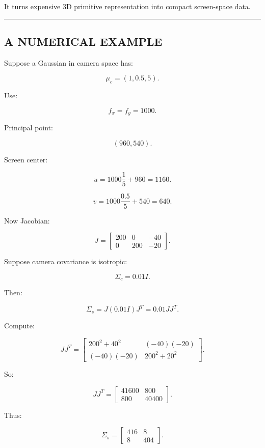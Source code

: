 It turns expensive 3D primitive representation into compact screen-space data.

\begin{center}\rule{0.5\linewidth}{0.5pt}\end{center}

\subsection{A NUMERICAL EXAMPLE}\label{04-visual-computing-ii-ch038-a-numerical-example}

\hypertarget{04-visual-computing-ii-ch038-a-numerical-example}{}

Suppose a Gaussian in camera space has:

\[
\mu_c=
(1,0.5,5).
\]

Use:

\[
f_x=f_y=1000.
\]

Principal point:

\[
(960,540).
\]

Screen center:

\[
u=
1000\frac15+960
=
1160.
\]

\[
v=
1000\frac{0.5}{5}+540
=
640.
\]

Now Jacobian:

\[
J=
\begin{bmatrix}
200&0&-40\\
0&200&-20
\end{bmatrix}.
\]

Suppose camera covariance is isotropic:

\[
\Sigma_c=
0.01I.
\]

Then:

\[
\Sigma_s=
J(0.01I)J^T
=
0.01JJ^T.
\]

Compute:

\[
JJ^T
=
\begin{bmatrix}
200^2+40^2
&
(-40)(-20)
\\
(-40)(-20)
&
200^2+20^2
\end{bmatrix}.
\]

So:

\[
JJ^T=
\begin{bmatrix}
41600&800\\
800&40400
\end{bmatrix}.
\]

Thus:

\[
\Sigma_s=
\begin{bmatrix}
416&8\\
8&404
\end{bmatrix}.
\]


